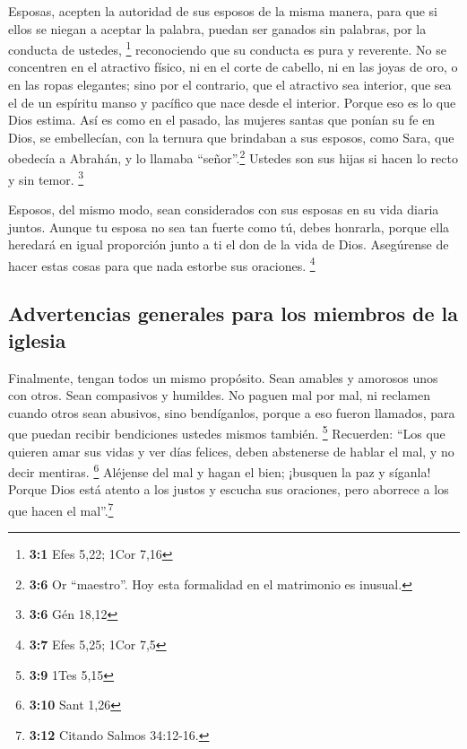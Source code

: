  Esposas, acepten la autoridad de sus esposos de la misma
manera, para que si ellos se niegan a aceptar la palabra, puedan ser
ganados sin palabras, por la conducta de ustedes, \footnote{\textbf{3:1}
  Efes 5,22; 1Cor 7,16}  reconociendo que su conducta es
pura y reverente.  No se concentren en el atractivo
físico, ni en el corte de cabello, ni en las joyas de oro, o en las
ropas elegantes;  sino por el contrario, que el atractivo
sea interior, que sea el de un espíritu manso y pacífico que nace desde
el interior. Porque eso es lo que Dios estima.  Así es
como en el pasado, las mujeres santas que ponían su fe en Dios, se
embellecían, con la ternura que brindaban a sus esposos, 
como Sara, que obedecía a Abrahán, y lo llamaba ``señor''.\footnote{\textbf{3:6}
  Or ``maestro''. Hoy esta formalidad en el matrimonio es inusual.}
Ustedes son sus hijas si hacen lo recto y sin temor. \footnote{\textbf{3:6}
  Gén 18,12}

 Esposos, del mismo modo, sean considerados con sus
esposas en su vida diaria juntos. Aunque tu esposa no sea tan fuerte
como tú, debes honrarla, porque ella heredará en igual proporción junto
a ti el don de la vida de Dios. Asegúrense de hacer estas cosas para que
nada estorbe sus oraciones. \footnote{\textbf{3:7} Efes 5,25; 1Cor 7,5}

\hypertarget{advertencias-generales-para-los-miembros-de-la-iglesia}{%
\subsection{Advertencias generales para los miembros de la
iglesia}\label{advertencias-generales-para-los-miembros-de-la-iglesia}}

 Finalmente, tengan todos un mismo propósito. Sean amables
y amorosos unos con otros. Sean compasivos y humildes.  No
paguen mal por mal, ni reclamen cuando otros sean abusivos, sino
bendíganlos, porque a eso fueron llamados, para que puedan recibir
bendiciones ustedes mismos también. \footnote{\textbf{3:9} 1Tes 5,15}
 Recuerden: ``Los que quieren amar sus vidas y ver días
felices, deben abstenerse de hablar el mal, y no decir mentiras.
\footnote{\textbf{3:10} Sant 1,26}  Aléjense del mal y
hagan el bien; ¡busquen la paz y síganla!  Porque Dios
está atento a los justos y escucha sus oraciones, pero aborrece a los
que hacen el mal''.\footnote{\textbf{3:12} Citando Salmos 34:12-16.}

